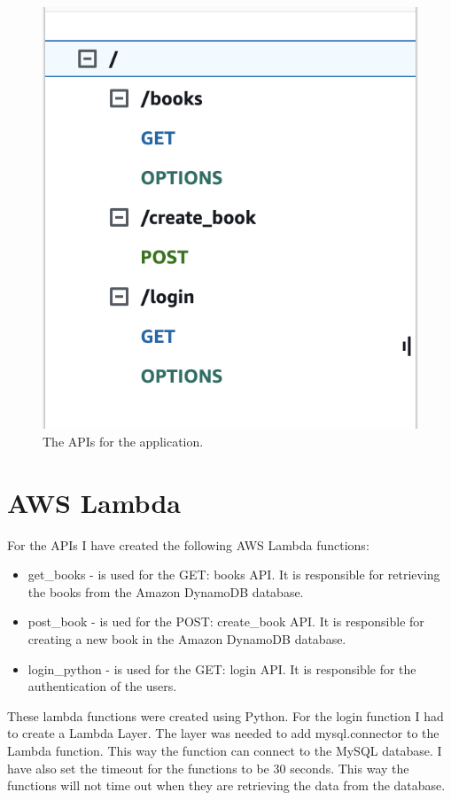 \documentclass[11pt,a4paper,oneside]{report}
\begin{document}
\begin{figure}[!ht]
  \centering
  \includegraphics[scale=0.5]{api.png}
  \caption{The APIs for the application.}
  \label{fig:TexnicCenter}
\end{figure}

\section{AWS Lambda}

For the APIs I have created the following AWS Lambda functions:
\begin{itemize}
  \item get\_books - is used for the GET: books API. It is responsible for retrieving the books from the Amazon DynamoDB database.
  \item post\_book - is ued for the POST: create\_book API. It is responsible for creating a new book in the Amazon DynamoDB database.
  \item login\_python - is used for the GET: login API. It is responsible for the authentication of the users.
\end{itemize}

These lambda functions were created using Python. For the login function I had to create a Lambda Layer. The layer was needed to add mysql.connector to the Lambda function. This way the function can connect to the MySQL database. I have also set the timeout for the functions to be 30 seconds. This way the functions will not time out when they are retrieving the data from the database.
\end{document}
